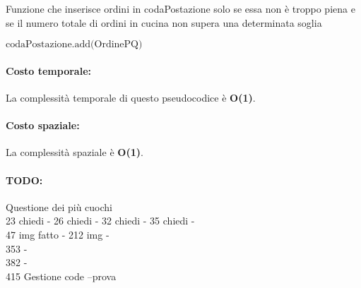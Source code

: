 \begin{algorithm}[h]
	\begin{algorithmic}[h!]
		\caption{Funzione che inserisce ordini in codaPostazione solo se essa non è troppo piena e se il numero totale di ordini in cucina non supera una determinata soglia}
		\State $\text{codaPostazione.add(OrdinePQ)}$
		\EndIf
		\EndProcedure
	\end{algorithmic}
\end{algorithm}

\paragraph{Costo temporale:}
La complessità temporale di questo pseudocodice è \textbf{O(1)}.

\paragraph{Costo spaziale:}
La complessità spaziale è \textbf{O(1)}.

\paragraph{TODO:}

Questione dei più cuochi\\
23 chiedi -
26  chiedi -
32  chiedi -
35  chiedi -\\
47 img fatto -
212 img -\\
353 -\\
382 -\\
415 Gestione code --prova

\clearpage